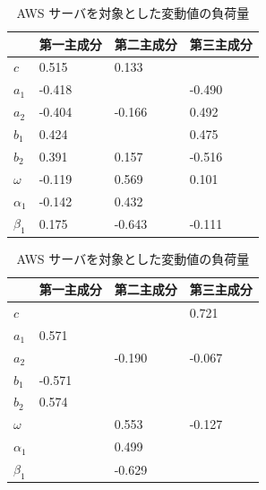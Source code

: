 \documentclass[a4j]{jarticle}
\begin{document}
\begin{table}[tb]
\centering
\begin{minipage}[t]{.45\textwidth}
\caption{AWS サーバを対象とした実測値の負荷量}
\label{comp-loading-1}
\begin{tabular}{|l|l|l|l|}
\hline
&第一主成分&第二主成分&第三主成分\\
\hline
$c$&0.515&0.133& \\
$a_1$&-0.418&&-0.490\\
$a_2$&-0.404&-0.166&0.492\\
$b_1$&0.424&&0.475\\
$b_2$&0.391&0.157&-0.516\\
$\omega$&-0.119&0.569&0.101\\
$\alpha_1$&-0.142&0.432&\\
$\beta_1$&0.175&-0.643&-0.111\\
\hline
\end{tabular}
\end{minipage}
\hfill
\begin{minipage}[t]{.45\textwidth}
\caption{AWS サーバを対象とした変動値の負荷量}
\begin{tabular}{|l|l|l|l|}
\hline
&第一主成分&第二主成分&第三主成分\\
\hline
$c$&&&0.721\\
$a_1$&0.571&&\\
$a_2$&&-0.190&-0.067\\
$b_1$&-0.571&&\\
$b_2$&0.574&&\\
$\omega$&&0.553&-0.127\\
$\alpha_1$&&0.499&\\
$\beta_1$&&-0.629&\\
\hline
\end{tabular}
\end{minipage}


\end{table}
\end{document}
